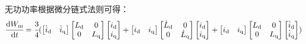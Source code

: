 无功功率根据微分链式法则可得：
\begin{equation*}
    \cfrac{\mathrm{d} W_{\mathrm{m}}}{\mathrm{d} t}=\cfrac 34(\begin{bmatrix}
    \dot{i}_{\mathrm{d}}&\dot{i}_{\mathrm{q}}\end{bmatrix}
    \begin{bmatrix}L_{\mathrm{d}}&0\\0&L_{\mathrm{q}}\end{bmatrix}
    \begin{bmatrix}i_{\mathrm{d}}\\i_{\mathrm{q}}\end{bmatrix}
    +\begin{bmatrix}{i}_{\mathrm{d}}&{i}_{\mathrm{q}}\end{bmatrix}
    \begin{bmatrix}\dot{L}_{\mathrm{d}}&0\\0&\dot{L}_{\mathrm{q}}\end{bmatrix}
    \begin{bmatrix}i_{\mathrm{d}}\\i_{\mathrm{q}}\end{bmatrix}
    +\begin{bmatrix}i_{\mathrm{d}}&i_{\mathrm{q}}\end{bmatrix}
    \begin{bmatrix}L_{\mathrm{d}}&0\\0&L_{\mathrm{q}}\end{bmatrix}
    \begin{bmatrix}\dot{i}_{\mathrm{d}}\\\dot{i}_{\mathrm{q}}\end{bmatrix})
\end{equation*}

